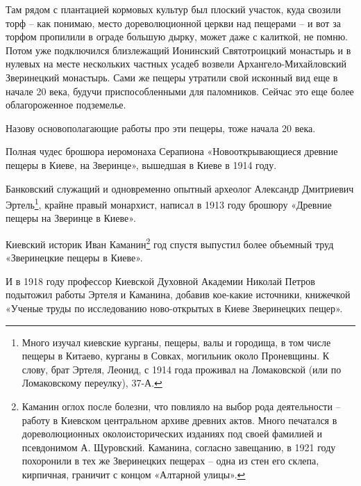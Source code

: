 Там рядом с плантацией кормовых культур был плоский участок, куда свозили торф – как понимаю, место дореволюционной церкви над пещерами – и вот за торфом пропилили в ограде большую дырку, может даже с калиткой, не помню. Потом уже подключился близлежащий Ионинский Святотроицкий монастырь и в нулевых на месте нескольких частных усадеб возвели Архангело-Михайловский Зверинецкий монастырь. Сами же пещеры утратили свой исконный вид еще в начале 20 века, будучи приспособленными для паломников. Сейчас это еще более облагороженное подземелье.

Назову основополагающие работы про эти пещеры, тоже начала 20 века.

Полная чудес брошюра иеромонаха Серапиона «Новооткрывающиеся древние пещеры в Киеве, на Зверинце», вышедшая в Киеве в 1914 году. 

Банковский служащий и одновременно опытный археолог Александр Дмитриевич Эртель\footnote{Много изучал киевские курганы, пещеры, валы и городища, в том числе пещеры в Китаево, курганы в Совках, могильник около Проневщины. К слову, брат Эртеля, Леонид, с 1914 года проживал на Ломаковской (или по Ломаковскому переулку), 37-А.}, крайне правый монархист, написал в 1913 году брошюру «Древние пещеры на Зверинце в Киеве».

Киевский историк Иван Каманин\footnote{Каманин оглох после болезни, что повлияло на выбор рода деятельности – работу в Киевском центральном архиве древних актов. Много печатался в дореволюционных околоисторических изданиях под своей фамилией и псевдонимом А. Щуровский. Каманина, согласно завещанию, в 1921 году похоронили в тех же Зверинецких пещерах – одна из стен его склепа, кирпичная, граничит с концом «Алтарной улицы».} год спустя выпустил более объемный труд «Зверинецкие пещеры в Киеве»\cite{kamanin01}.

И в 1918 году профессор Киевской Духовной Академии Николай Петров подытожил работы Эртеля и Каманина, добавив кое-какие источники, книжечкой «Ученые труды по исследованию ново-открытых в Киеве Зверинецких пещер».

 
